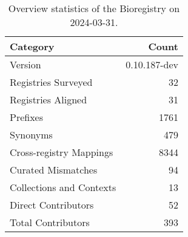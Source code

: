\begin{table}
\caption{Overview statistics of the Bioregistry on 2024-03-31.}
\label{tab:bioregistry-summary}
\begin{tabular}{lr}
\toprule
Category & Count \\
\midrule
Version & 0.10.187-dev \\
Registries Surveyed & 32 \\
Registries Aligned & 31 \\
Prefixes & 1761 \\
Synonyms & 479 \\
Cross-registry Mappings & 8344 \\
Curated Mismatches & 94 \\
Collections and Contexts & 13 \\
Direct Contributors & 52 \\
Total Contributors & 393 \\
\bottomrule
\end{tabular}
\end{table}
